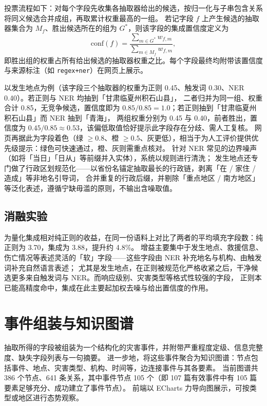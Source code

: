 \documentclass[11pt,a4paper]{ctexart}
\begin{document}
投票流程如下：对每个字段先收集各抽取器给出的候选，按归一化与子串包含关系将同义候选合并成组，再取累计权重最高的一组。
若记字段 $f$ 上产生候选的抽取器集合为 $M_f$、胜出候选所在的组为 $G^\ast$，则该字段的集成置信度定义为
\begin{equation}
\text{conf}(f)=\frac{\sum_{m\in G^\ast} w_{f,m}}{\sum_{m\in M_f} w_{f,m}},
\end{equation}
即胜出组的权重占所有给出候选的抽取器权重之比。每个字段最终均附带该置信度与来源标注（如 \texttt{regex+ner}）在网页上展示。

以发生地点为例（该字段三个抽取器的权重为正则 0.45、触发词 0.30、NER 0.40）。若正则与 NER 均抽到「甘肃临夏州积石山县」，
二者归并为同一组、权重合计 0.85，无竞争候选，置信度即为 $0.85/0.85=1.0$；若正则抽到「甘肃临夏州积石山县」而 NER 抽到「青海」，
两组权重分别为 0.45 与 0.40，前者胜出，置信度为 $0.45/0.85\approx0.53$，该偏低取值恰好提示此字段存在分歧、需人工复核。
网页再据此为字段着色（绿 $\ge 0.8$、橙 $\ge 0.5$、灰更低），相当于为人工评价提供优先级提示：绿色可快速通过，橙、灰则需重点核对。
针对 NER 常见的边界噪声（如将「当日」「日从」等前缀并入实体），系统以规则进行清洗；
发生地点还专门做了行政区划规范化——以省份名锚定抽取最长的行政链，剥离「在 / 家住 / 造成」等非地名引导词，
合并重复的行政后缀，并剔除「重点地区 / 南方地区」等泛化表述，遵循宁缺毋滥的原则，不输出含噪取值。

\subsection{消融实验}

为量化集成相对纯正则的收益，在同一份语料上对比了两者的平均填充字段数：纯正则为 3.70，集成为 3.88，提升约 4.8\%。
增益主要集中于发生地点、救援信息、伤亡情况等表述灵活的「软」字段——这些字段由 NER 补充地名与机构、由触发词补充自然语言表述；
尤其是发生地点，在正则被规范化严格收紧之后，干净候选更多来自触发词与 NER。而响应级别、灾害类型等格式性较强的字段，
正则本已能高精度命中，集成在此主要起加权去噪与给出置信度的作用。

\section{事件组装与知识图谱}

抽取所得的字段被组装为一个结构化的灾害事件，并附带严重程度定级、信息完整度、缺失字段列表与一句摘要。
进一步地，将这些事件聚合为知识图谱：节点包括事件、地点、灾害类型、机构、时间等，边连接事件与其各要素。
当前图谱共 386 个节点、641 条关系，其中事件节点 105 个（即 107 篇有效事件中有 105 篇要素足够充分、成功建立了事件节点）。
前端以 ECharts 力导向图展示，可按类型或地区进行态势观察。
\end{document}
